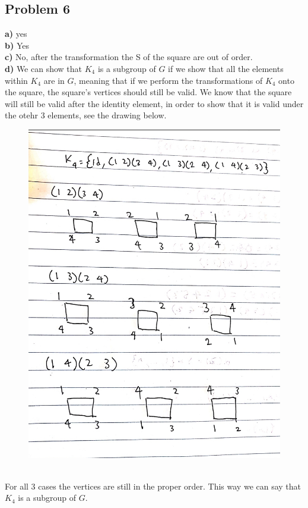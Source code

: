 \documentclass[12pt]{article}
\begin{document}
\subsection*{Problem 6}
\textbf{a) } yes\\
\textbf{b) } Yes\\
\textbf{c) } No, after the transformation the S of the square are out of order.\\
\textbf{d) } We can show that $K_4$ is a subgroup of $G$ if we show that all the elements within $K_4$ are in $G$, meaning that if we perform the transformations of $K_4$ onto the square, the square's vertices should still be valid. We know that the square will still be valid after the identity element, in order to show that it is valid under the otehr 3 elements, see the drawing below.\\
\begin{figure}[h!]
	\includegraphics[scale=0.2]{img.jpg}
\end{figure}\\
For all 3 cases the vertices are still in the proper order. This way we can say that $K_4$ is a subgroup of $G$.
\newpage
\end{document}

